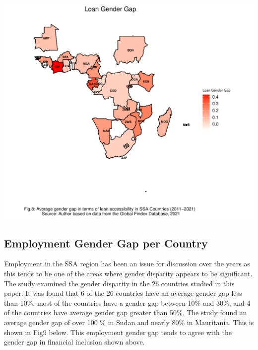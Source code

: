 \documentclass[preprint, 3p,
authoryear]{elsarticle} %
\begin{document}
\includegraphics{504.Project1_files/figure-latex/unnamed-chunk-4-3.pdf}

\hypertarget{employment-gender-gap-per-country}{%
\subsection{Employment Gender Gap per
Country}\label{employment-gender-gap-per-country}}

Employment in the SSA region has been an issue for discussion over the
years as this tends to be one of the areas where gender disparity
appears to be significant. The study examined the gender disparity in
the 26 countries studied in this paper. It was found that 6 of the 26
countries have an average gender gap less than 10\%, most of the
countries have a gender gap between 10\% and 30\%, and 4 of the
countries have average gender gap greater than 50\%. The study found an
average gender gap of over 100 \% in Sudan and nearly 80\% in
Mauritania. This is shown in Fig9 below. This employment gender gap
tends to agree with the gender gap in financial inclusion shown above.

\bigskip
\end{document}
